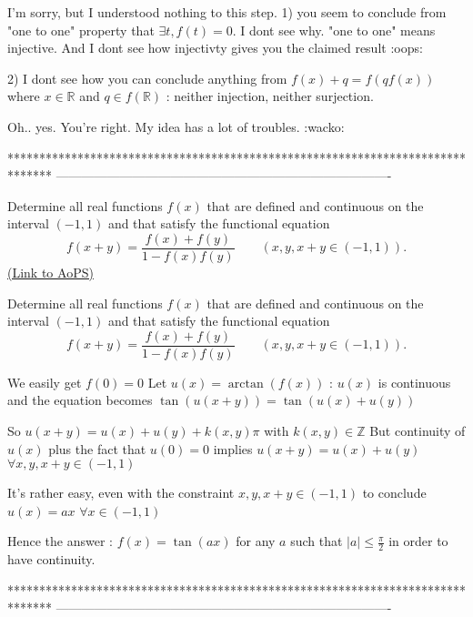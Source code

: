 \begin{solution}
	\begin{tcolorbox}I'm sorry, but I understood nothing to this step.
1) you seem to conclude from "one to one" property that $\exists t, f\left( t \right) = 0$. I dont see why. "one to one" means injective.  And I dont see how injectivty gives you the claimed result :oops:

2) I dont see how you can conclude anything from $f(x)+q=f(qf(x))$ where $x\in\mathbb R$ and $q\in f(\mathbb R)$ : neither injection, neither surjection.\end{tcolorbox}

Oh.. yes. You're right. My idea has a lot of troubles.  :wacko:
\end{solution}
*******************************************************************************
-------------------------------------------------------------------------------

\begin{problem}
	Determine all real functions $f(x)$ that are defined and continuous on the interval $(-1, 1)$ and that satisfy the functional equation
\[f(x+y)=\frac{f(x)+f(y)}{1-f(x) f(y)} \qquad (x, y, x + y \in (-1, 1)).\]
	\flushright \href{https://artofproblemsolving.com/community/c6h386060}{(Link to AoPS)}
\end{problem}



\begin{solution}
	\begin{tcolorbox}Determine all real functions $f(x)$ that are defined and continuous on the interval $(-1, 1)$ and that satisfy the functional equation
\[f(x+y)=\frac{f(x)+f(y)}{1-f(x) f(y)} \qquad (x, y, x + y \in (-1, 1)).\]\end{tcolorbox}
We easily get $f(0)=0$
Let $u(x)=\arctan(f(x))$ : $u(x)$ is continuous and the equation becomes $\tan(u(x+y))=\tan(u(x)+u(y))$

So $u(x+y)=u(x)+u(y)+k(x,y)\pi$ with $k(x,y)\in\mathbb Z$
But continuity of $u(x)$ plus the fact that $u(0)=0$ implies $u(x+y)=u(x)+u(y)$ $\forall x,y,x+y\in(-1,1)$

It's rather easy, even with the constraint $x,y,x+y\in(-1,1)$ to conclude $u(x)=ax$ $\forall x\in(-1,1)$

Hence the answer : $\boxed{f(x)=\tan(ax)}$ for any $a$ such that $|a|\le \frac{\pi}2$ in order to have continuity.
\end{solution}
*******************************************************************************
-------------------------------------------------------------------------------

